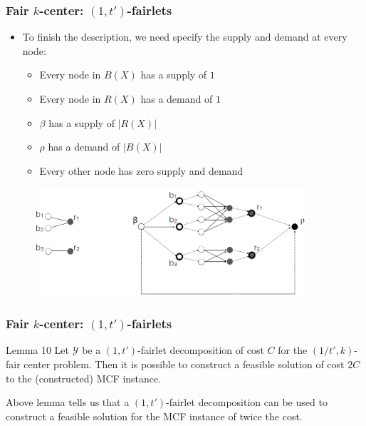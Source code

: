 \documentclass{beamer}
\begin{document}
\begin{frame}
\frametitle{Fair $k$-center: $(1, t')$-fairlets}

\begin{itemize}
	\item To finish the description, we need specify the supply and demand at every node:
	\begin{itemize}
		\item Every node in $B(X)$ has a supply of $1$
		\item Every node in $R(X)$ has a demand of $1$
		\item $\beta$ has a supply of $|R(X)|$
		\item $\rho$ has a demand of $|B(X)|$
		\item Every other node has zero supply and demand
	\end{itemize}
\end{itemize} \pause

\begin{figure}[hbt]
  \includegraphics[height=4cm]{fig3.png}
\end{figure}

\end{frame}


\begin{frame}
\frametitle{Fair $k$-center: $(1, t')$-fairlets}

\begin{block}{Lemma 10}
Let $\mathcal{Y}$ be a $(1, t')$-fairlet decomposition of cost $C$ for the $(1/t', k)$-fair center problem. Then it is possible to construct a feasible solution of cost $2C$ to the (constructed) MCF instance.

\end{block}

Above lemma tells us that a $(1, t')$-fairlet decomposition can be used to construct a feasible solution for the MCF instance of twice the cost.

\end{frame}
\end{document}
